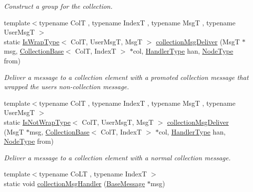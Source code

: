 \begin{DoxyCompactItemize}
\begin{DoxyCompactList}\small\item\em Construct a group for the collection. \end{DoxyCompactList}\item 
{\footnotesize template$<$typename ColT , typename IndexT , typename MsgT , typename User\+MsgT $>$ }\\static \hyperlink{structvt_1_1vrt_1_1collection_1_1_collection_manager_a1f91c97ed52237c3a3576dfbbe87c8f8}{Is\+Wrap\+Type}$<$ ColT, User\+MsgT, MsgT $>$ \hyperlink{structvt_1_1vrt_1_1collection_1_1_collection_manager_aeefbfe1468c9583c4ffb730b6fbdd263}{collection\+Msg\+Deliver} (MsgT $\ast$msg, \hyperlink{structvt_1_1vrt_1_1collection_1_1_collection_base}{Collection\+Base}$<$ ColT, IndexT $>$ $\ast$col, \hyperlink{namespacevt_af64846b57dfcaf104da3ef6967917573}{Handler\+Type} han, \hyperlink{namespacevt_a866da9d0efc19c0a1ce79e9e492f47e2}{Node\+Type} from)
\begin{DoxyCompactList}\small\item\em Deliver a message to a collection element with a promoted collection message that wrapped the user\textquotesingle{}s non-\/collection message. \end{DoxyCompactList}\item 
{\footnotesize template$<$typename ColT , typename IndexT , typename MsgT , typename User\+MsgT $>$ }\\static \hyperlink{structvt_1_1vrt_1_1collection_1_1_collection_manager_a18e3a17d9eb086c6c2f499242b7faa1e}{Is\+Not\+Wrap\+Type}$<$ ColT, User\+MsgT, MsgT $>$ \hyperlink{structvt_1_1vrt_1_1collection_1_1_collection_manager_a2c5223b9c6bf628b8e00e8f95fc6d0bc}{collection\+Msg\+Deliver} (MsgT $\ast$msg, \hyperlink{structvt_1_1vrt_1_1collection_1_1_collection_base}{Collection\+Base}$<$ ColT, IndexT $>$ $\ast$col, \hyperlink{namespacevt_af64846b57dfcaf104da3ef6967917573}{Handler\+Type} han, \hyperlink{namespacevt_a866da9d0efc19c0a1ce79e9e492f47e2}{Node\+Type} from)
\begin{DoxyCompactList}\small\item\em Deliver a message to a collection element with a normal collection message. \end{DoxyCompactList}\item 
{\footnotesize template$<$typename Co\+LT , typename IndexT $>$ }\\static void \hyperlink{structvt_1_1vrt_1_1collection_1_1_collection_manager_a9b2bfe1f74298f0e9b7fdc4888f73e3d}{collection\+Msg\+Handler} (\hyperlink{namespacevt_ac34f95a5e2b8109b55bfba52b074443d}{Base\+Message} $\ast$msg)

\end{DoxyCompactItemize}

